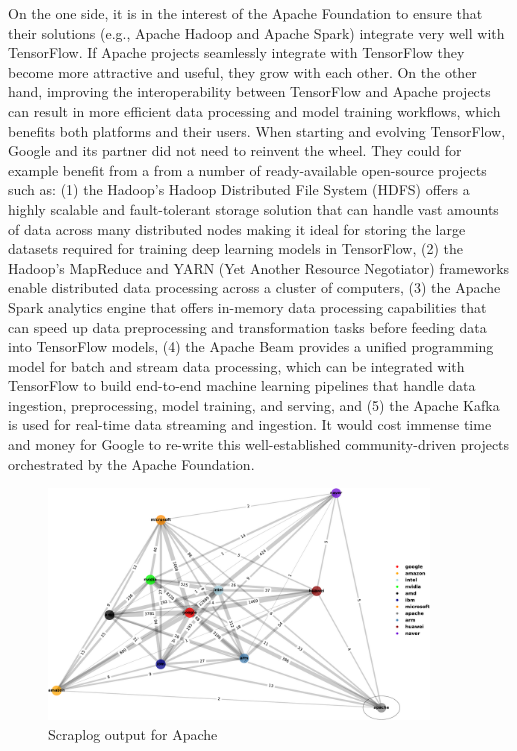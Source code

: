 \documentclass[CHICAGO,Times1COL]{WileyNJDv5} %
\begin{document}
On the one side, it is in the interest of the Apache Foundation to ensure that their solutions (e.g., Apache Hadoop and Apache Spark)  integrate very well with TensorFlow. If Apache projects seamlessly integrate with TensorFlow they become more attractive and useful, they grow with each other.  On the other hand, improving the interoperability between TensorFlow and Apache projects can result in more efficient data processing and model training workflows, which benefits both platforms and their users.  When starting and evolving TensorFlow, Google and its partner did not need to reinvent the wheel. They could for example benefit from a from a number of ready-available open-source projects such as: (1) the Hadoop's Hadoop Distributed File System (HDFS) offers a highly scalable and fault-tolerant storage solution that can handle vast amounts of data across many distributed nodes making it ideal for storing the large datasets required for training deep learning models in TensorFlow, (2) the  Hadoop's MapReduce and YARN (Yet Another Resource Negotiator) frameworks enable distributed data processing across a cluster of computers, (3) the Apache Spark analytics engine that offers in-memory data processing capabilities that can speed up data preprocessing and transformation tasks before feeding data into TensorFlow models, (4) the Apache Beam provides a unified programming model for batch and stream data processing, which can be integrated with TensorFlow  to build end-to-end machine learning pipelines that handle data ingestion, preprocessing, model training, and serving, and (5) the Apache Kafka is used for real-time data streaming and ingestion. It would cost immense time and money for Google to re-write this well-established community-driven projects orchestrated by the Apache Foundation. 


\begin{figure}[h]
\centering
\includegraphics[keepaspectratio=true,width=0.9\textwidth]{./Figures/noo/Apache_cropped.pdf}
\caption{Scraplog output for Apache}
\label{figApache}
\end{figure}
\end{document}

